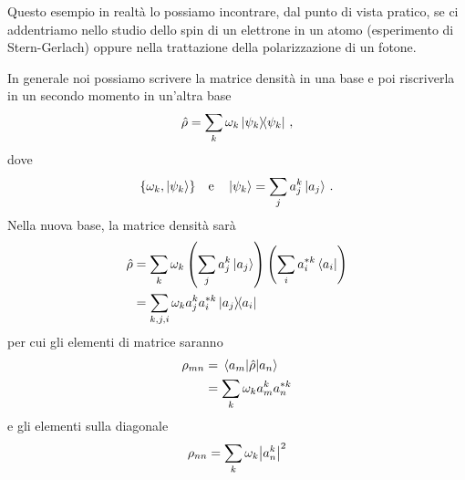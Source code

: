 \noindent Questo esempio in realtà lo possiamo incontrare, dal punto di vista pratico, se ci addentriamo nello studio dello spin di un elettrone in un atomo (esperimento di Stern-Gerlach) oppure nella trattazione della polarizzazione di un fotone.

\noindent In generale noi possiamo scrivere la matrice densità in una base e poi riscriverla in un secondo momento in un'altra base
\begin{equation*}
    \hat \rho = \sum_k \omega_k \op{\psi_k}{\psi_k} \, ,
\end{equation*}
dove 
\begin{equation*}
    \{\omega_k, \ket{\psi_k}\} \quad \text{e} \quad \ket{\psi_k}=\sum_j a_j^k \ket{a_j} \, .
\end{equation*}
Nella nuova base, la matrice densità sarà
\begin{equation*}
    \begin{aligned}
        \hat \rho &= \sum_k {\omega_k}\left(\sum_j a_j^k \ket{a_j}\right)\left(\sum_i a_i^{*k}\bra{a_i}\right) \\
             &= \sum_{k,j,i} \omega_k a_j^ka_i^{*k}\op{a_j}{a_i}
    \end{aligned}
\end{equation*}
per cui gli elementi di matrice saranno
\begin{equation*}
    \begin{aligned}
        \rho_{mn} &= \mel{a_m}{\hat \rho}{a_n} \\
                       &= \sum_k \omega_k a_m^ka_n^{*k}
    \end{aligned}
\end{equation*}
e gli elementi sulla diagonale
\begin{equation*}
    \rho_{nn}=\sum_k\omega_k \abs{a_n^k}^2
\end{equation*}

